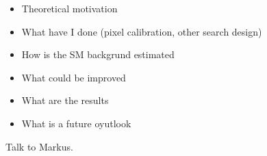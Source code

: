 

\begin{itemize}
\item Theoretical motivation
\item What have I done (pixel calibration, other search design)
\item How is the SM backgrund estimated
\item What could be improved
\item What are the results
\item What is a future oyutlook
\end{itemize}

Talk to Markus.
